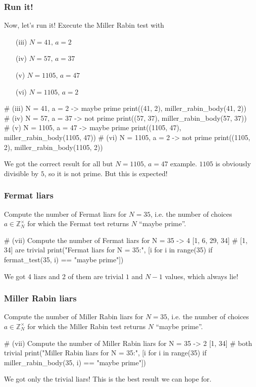 \documentclass{article}
\newcommand{\Z}{\mathbb{Z}}
\begin{document}
  \subsubsection{Run it!}
  \begin{centerframebox}
    Now, let's run it! Execute the Miller Rabin test with
    \begin{enumerate}
      \item[(iii)] $N = 41,\, a = 2$
      \item[(iv)] $N = 57,\, a = 37$
      \item[(v)] $N = 1105,\, a = 47$
      \item[(vi)] $N = 1105,\, a = 2$
    \end{enumerate}
  \end{centerframebox}
  \begin{mylisting}
    # (iii) N = 41, a = 2    -> maybe prime
    print((41, 2), miller_rabin_body(41, 2))
    # (iv) N = 57, a = 37    -> not prime
    print((57, 37), miller_rabin_body(57, 37))
    # (v) N = 1105, a = 47   -> maybe prime
    print((1105, 47), miller_rabin_body(1105, 47))
    # (vi) N = 1105, a = 2   -> not prime
    print((1105, 2), miller_rabin_body(1105, 2))
  \end{mylisting}
  We got the correct result for all but $N = 1105,\, a = 47$ example.
  $1105$ is obviously divisible by $5$, so it is not prime.
  But this is expected!

  \subsubsection{Fermat liars}
  \begin{centerframebox}
    Compute the number of Fermat liars for $N = 35$, i.e. the number of
    choices $a \in \Z^\times_N$ for which the Fermat test returns $N$ ``maybe prime''.
  \end{centerframebox}
  \begin{mylisting}
    # (vii) Compute the number of Fermat liars for N = 35  -> 4  [1, 6, 29, 34]
    # [1, 34] are trivial
    print("Fermat liars for N = 35:", [i for i in range(35) if fermat_test(35, i) == "maybe prime"])
  \end{mylisting}
  We got 4 liars and 2 of them are trivial $1$ and $N-1$ values, which always lie!

  \subsubsection{Miller Rabin liars}
  \begin{centerframebox}
    Compute the number of Miller Rabin liars for $N = 35$, i.e. the number of
    choices $a \in \Z^\times_N$ for which the Miller Rabin test returns $N$ ``maybe prime''.
  \end{centerframebox}
  \begin{mylisting}
    # (vii) Compute the number of Miller Rabin liars for N = 35  -> 2  [1, 34]
    # both trivial
    print("Miller Rabin liars for N = 35:", [i for i in range(35) if miller_rabin_body(35, i) == "maybe prime"])
  \end{mylisting}
  We got only the trivial liars! This is the best result we can hope for.
\end{document}
